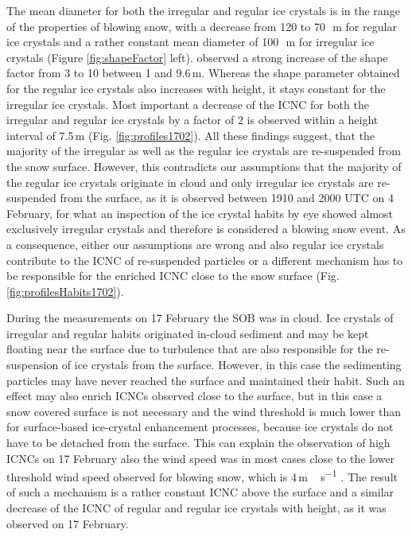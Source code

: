 \documentclass[draft,linenumbers]{agujournal}
\begin{document}
The mean diameter for both the irregular and regular ice crystals is in the range of the properties of blowing snow, with a decrease from 120 to 70\,\si{\mu m} for regular ice crystals and a rather constant  mean diameter of 100\,\si{\mu m}  for irregular ice crystals (Figure \ref{fig:shapeFactor} left). \citet{Nis05} observed a strong increase of the shape factor from 3 to 10 between 1 and 9.6\,\si{m}. Whereas the shape parameter obtained for the regular ice crystals also increases with height, it stays constant for the irregular ice crystals. Most important a decrease of the ICNC for both the irregular and regular ice crystals by a factor of 2 is observed within a height interval of 7.5\,\si{m} (Fig. \ref{fig:profiles1702}). All these findings suggest, that the majority of the irregular as well as the regular ice crystals are re-suspended from the snow surface. However, this contradicts our assumptions that the majority of the regular ice crystals originate in cloud and only irregular ice crystals are re-suspended from the surface, as it is observed between 1910 and 2000 UTC on 4 February, for what an inspection of the ice crystal habits by eye showed almost exclusively irregular crystals and therefore is considered a blowing snow event. As a consequence, either our assumptions are wrong and also regular ice crystals contribute to the ICNC of re-suspended particles or a different mechanism has to be responsible for the enriched ICNC close to the snow surface (Fig. \ref{fig:profilesHabits1702}). 

During the measurements on 17 February the SOB was in cloud. Ice crystals of irregular and regular habits originated in-cloud sediment and may be kept floating near the surface due to turbulence that are also responsible for the re-suspension of ice crystals from the surface. However, in this case the sedimenting particles may have never reached the surface and maintained their habit. Such an effect may also enrich ICNCs observed close to the surface, but in this case a snow covered surface is not necessary and the wind threshold is much lower than for surface-based ice-crystal enhancement processes, because ice crystals do not have to be detached from the surface. This can explain the observation of high ICNCs on 17 February also the wind speed was in most cases close to the lower threshold wind speed observed for blowing snow, which is 4\,\si{m\,s^{-1}} \citep{Bro88, Li97, Mah03, Der99}. The result of such a mechanism is a rather constant ICNC above the surface and a similar decrease of the ICNC of regular and regular ice crystals with height, as it was observed on 17 February. 
\end{document}
